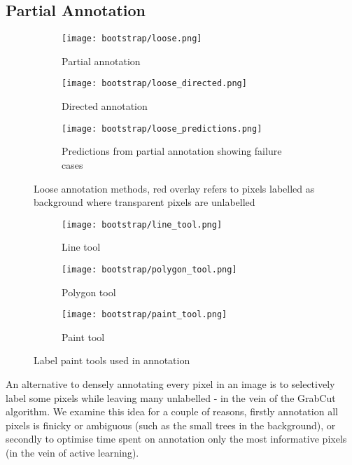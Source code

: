 \subsection {Partial Annotation}


\begin{figure*}[!ht]
\centering
\begin{subfigure}[t]{.3\textwidth}
  \centering
  \texttt{[image: bootstrap/loose.png]}
  \caption{Partial annotation}
  \label{fig:bootstrap_loose_annot}
\end{subfigure}%
\begin{subfigure}[t]{.3\textwidth}
  \centering
  \texttt{[image: bootstrap/loose\_directed.png]}
  \caption{Directed annotation}
  \label{fig:bootstrap_loose_dir}

\end{subfigure}%
\begin{subfigure}[t]{.3\textwidth}
  \centering
  \texttt{[image: bootstrap/loose\_predictions.png]}
  \caption{Predictions from partial annotation showing failure cases}
  \label{fig:bootstrap_loose_pred}
\end{subfigure}
  \caption{Loose annotation methods, red overlay refers to pixels labelled as background where transparent pixels are unlabelled}


\end{figure*}

\begin{figure}
\centering
\begin{subfigure}[t]{.15\textwidth}
  \centering
  \texttt{[image: bootstrap/line\_tool.png]}
  \caption{Line tool}
\end{subfigure}%
\begin{subfigure}[t]{.15\textwidth}
  \centering
  \texttt{[image: bootstrap/polygon\_tool.png]}
  \caption{Polygon tool}
\end{subfigure}%
\begin{subfigure}[t]{.15\textwidth}
  \centering
  \texttt{[image: bootstrap/paint\_tool.png]}
  \caption{Paint tool}
\end{subfigure}%

  \caption{Label paint tools used in annotation}
  \label{fig:bootstrap_tools}

\end{figure}



An alternative to densely annotating every pixel in an image is to selectively label some pixels while leaving many unlabelled - in the vein of the GrabCut algorithm. We examine this idea for a couple of reasons, firstly annotation all pixels is finicky or ambiguous (such as the small trees in the background), or secondly to optimise time spent on annotation only the most informative pixels (in the vein of active learning).

